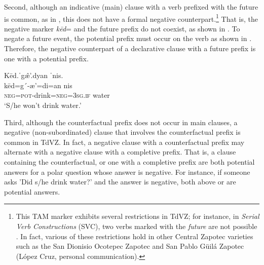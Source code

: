 \documentclass[output=paper,colorlinks=true, citecolor=brown]{langscibook}
\begin{document}
Second, although an indicative (main) clause with a verb prefixed with the future is common, as in , this does not have a formal negative counterpart.\footnote{This TAM marker exhibits several restrictions in TdVZ; for instance, in \textit{Serial Verb Constructions} (SVC), two verbs marked with the \textit{future} are not possible \citep{Gutiérrez2014}. In fact, various of these restrictions hold in other Central Zapotec varieties such as the San Dionisio Ocotepec Zapotec \citep{Broadwell2012} and San Pablo Güilá Zapotec (López Cruz, personal communication).} That is, the negative marker \textit{kēd}= and the future prefix do not coexist, as shown in . To negate a future event, the potential prefix must occur on the verb as shown in . Therefore, the negative counterpart of a declarative clause with a future prefix is one with a potential prefix.

\ea\label{ex:zap:12}
    \z
\z 

\ea\label{ex:zap:13} 
    \glll Kēd.ˈg\^{æ}’.dyan ˈnis.\\ 
          kēd=g´-æ’=di=an nis\\
           \textsc{neg}=\textsc{pot}{}-drink=\textsc{neg}=\textsc{3sg.if} water\\
    \glt  ‘S/he won’t drink water.’
\z 

Third, although the counterfactual prefix does not occur in main clauses, a negative (non-subordinated) clause that involves the counterfactual prefix is common in TdVZ. In fact, a negative clause with a counterfactual prefix may alternate with a negative clause with a completive prefix. That is, a clause containing the counterfactual, or one with a completive prefix are both potential answers for a polar question whose answer is negative. For instance, if someone asks 'Did s/he drink water?' and the answer is negative, both  above or  are potential answers.
\end{document}
